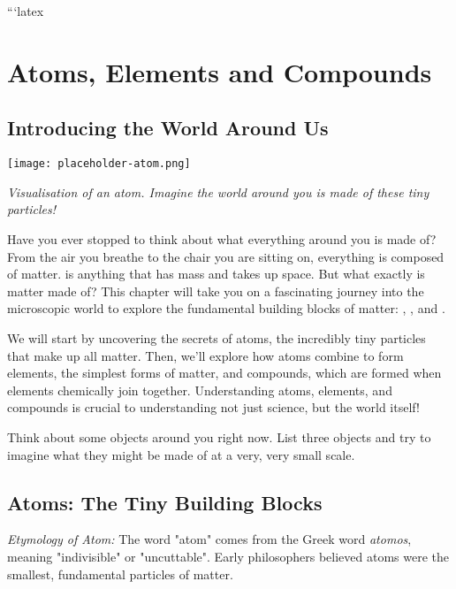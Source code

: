 ```latex
\chapter{Atoms, Elements and Compounds}

\section{Introducing the World Around Us}

\begin{marginfigure}
\texttt{[image: placeholder-atom.png]}
\caption*{\textit{Visualisation of an atom. Imagine the world around you is made of these tiny particles!}}
\end{marginfigure}

Have you ever stopped to think about what everything around you is made of? From the air you breathe to the chair you are sitting on, everything is composed of matter.   is anything that has mass and takes up space. But what exactly is matter made of?  This chapter will take you on a fascinating journey into the microscopic world to explore the fundamental building blocks of matter: , , and .

We will start by uncovering the secrets of atoms, the incredibly tiny particles that make up all matter. Then, we'll explore how atoms combine to form elements, the simplest forms of matter, and compounds, which are formed when elements chemically join together.  Understanding atoms, elements, and compounds is crucial to understanding not just science, but the world itself!

\begin{stopandthink}
Think about some objects around you right now. List three objects and try to imagine what they might be made of at a very, very small scale.
\end{stopandthink}

\section{Atoms: The Tiny Building Blocks}

\begin{marginnote}
\textit{Etymology of Atom:} The word "atom" comes from the Greek word \textit{atomos}, meaning "indivisible" or "uncuttable".  Early philosophers believed atoms were the smallest, fundamental particles of matter.
\end{marginnote}

